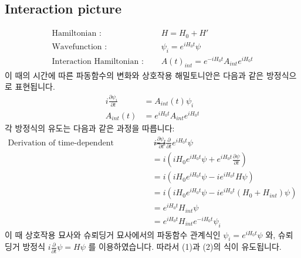 \documentclass{article}
\begin{document}
\subsection*{Interaction picture}
\begin{align*}
    \text{Hamiltonian : }  \quad & H = H_0 + H' \\
    \text{Wavefunction : }\quad &\psi_{i} = e^{iH_0t}\psi \\
    \text{Interaction Hamiltonian : } \quad & A(t)_{int} = e^{-iH_0t}A_{int}e^{iH_0t}
\end{align*}
 이 때의 시간에 따른 파동함수의 변화와 상호작용 해밀토니안은 다음과 같은 방정식으로 표현됩니다.
 \begin{align}
    i\frac{\partial{\psi_i}}{\partial{t}} &= A_{int}(t)\psi_i\\
      A_{int}(t)&=e^{iH_0 t}A_{int}e^{iH_0t}
 \end{align}
 각 방정식의 유도는 다음과 같은 과정을 따릅니다:
 \begin{align*}
    \text{Derivation of time-dependent Wavefunction : } \quad  i\frac{\partial{\psi_i}}{\partial{t}} 
    &= i\frac{\partial}{\partial{t}}e^{iH_0 t}\psi \\
    & = i(iH_0 e^{iH_0 t} \psi + e^{iH_0 t} \frac{\partial{\psi}}{\partial{t}}) \\
    & = i(iH_0 e^{iH_0 t} \psi - i e^{iH_0 t} H \psi) \\
    & = i(iH_0 e^{iH_0 t} \psi - i e^{iH_0 t} (H_0 + H_{int}) \psi) \\
    & = e^{iH_0t}H_{int}\psi\\
    & = e^{iH_0t}H_{int}e^{-iH_0t}\psi_i
 \end{align*}
 이 때 상호작용 묘사와 슈뢰딩거 묘사에서의 파동함수 관계식인 $\psi_i = e^{iH_0t}\psi$ 와, 슈뢰딩거 방정식 $ i\frac{\partial}{\partial{t}}\psi = H\psi $ 
 를 이용하였습니다. 따라서 (1)과 (2)의 식이 유도됩니다.
\end{document}
